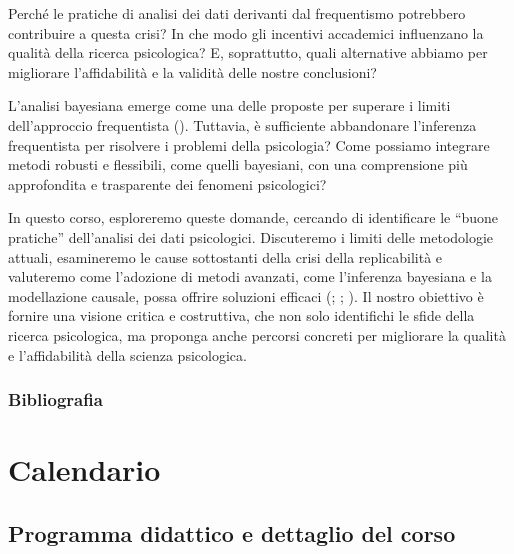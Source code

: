 \documentclass[
  letterpaper,
]{krantz}
\begin{document}
Perché le pratiche di analisi dei dati derivanti dal frequentismo
potrebbero contribuire a questa crisi? In che modo gli incentivi
accademici influenzano la qualità della ricerca psicologica? E,
soprattutto, quali alternative abbiamo per migliorare l'affidabilità e
la validità delle nostre conclusioni?

L'analisi bayesiana emerge come una delle proposte per superare i limiti
dell'approccio frequentista (). Tuttavia, è sufficiente abbandonare l'inferenza
frequentista per risolvere i problemi della psicologia? Come possiamo
integrare metodi robusti e flessibili, come quelli bayesiani, con una
comprensione più approfondita e trasparente dei fenomeni psicologici?

In questo corso, esploreremo queste domande, cercando di identificare le
``buone pratiche'' dell'analisi dei dati psicologici. Discuteremo i
limiti delle metodologie attuali, esamineremo le cause sottostanti della
crisi della replicabilità e valuteremo come l'adozione di metodi
avanzati, come l'inferenza bayesiana e la modellazione causale, possa
offrire soluzioni efficaci
(;
;
). Il nostro
obiettivo è fornire una visione critica e costruttiva, che non solo
identifichi le sfide della ricerca psicologica, ma proponga anche
percorsi concreti per migliorare la qualità e l'affidabilità della
scienza psicologica.

\section*{Bibliografia}\label{bibliografia}


\part{Calendario}

\chapter*{Programma didattico e dettaglio del
corso}\label{programma-didattico-e-dettaglio-del-corso}
\end{document}

